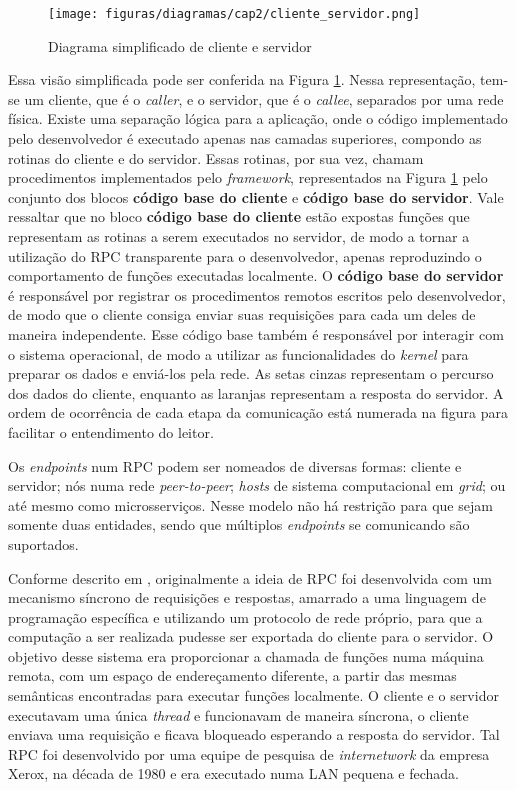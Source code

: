 \begin{figure}[ht]
    \centering
    \caption{Diagrama simplificado de cliente e servidor}
    \texttt{[image: figuras/diagramas/cap2/cliente\_servidor.png]} 
    \label{fig:rpc_client_servidor}
\end{figure}

Essa visão simplificada pode ser conferida na Figura \ref{fig:rpc_client_servidor}. Nessa representação, tem-se um cliente, que é o \textit{caller}, e o servidor, que é o \textit{callee}, separados por uma rede física. Existe uma separação lógica para a aplicação, onde o código implementado pelo desenvolvedor é executado apenas nas camadas superiores, compondo as rotinas do cliente e do servidor. Essas rotinas, por sua vez, chamam procedimentos implementados pelo \textit{framework}, representados na Figura \ref{fig:rpc_client_servidor} pelo conjunto dos blocos \textbf{código base do cliente} e \textbf{código base do servidor}. Vale ressaltar que no bloco \textbf{código base do cliente} estão expostas funções que representam as rotinas a serem executados no servidor, de modo a tornar a utilização do RPC transparente para o desenvolvedor, apenas reproduzindo o comportamento de funções executadas localmente. O \textbf{código base do servidor} é responsável por registrar os procedimentos remotos escritos pelo desenvolvedor, de modo que o cliente consiga enviar suas requisições para cada um deles de maneira independente. Esse código base também é responsável por interagir com o sistema operacional, de modo a utilizar as funcionalidades do \textit{kernel} para preparar os dados e enviá-los pela rede. As setas cinzas representam o percurso dos dados do cliente, enquanto as laranjas representam a resposta do servidor. A ordem de ocorrência de cada etapa da comunicação está numerada na figura para facilitar o entendimento do leitor.

Os \textit{endpoints} num RPC podem ser nomeados de diversas formas: cliente e servidor; nós numa rede \textit{peer-to-peer}; \textit{hosts} de sistema computacional em \textit{grid}; ou até mesmo como microsserviços. Nesse modelo não há restrição para que sejam somente duas entidades, sendo que múltiplos \textit{endpoints} se comunicando são suportados\cite{bergstrom2007anycast}.

Conforme descrito em \cite{birrell1984implementing}, originalmente a ideia de RPC foi desenvolvida com um mecanismo síncrono de requisições e respostas, amarrado a uma linguagem de programação específica e utilizando um protocolo de rede próprio, para que a computação a ser realizada pudesse ser exportada do cliente para o servidor. O objetivo desse sistema era proporcionar a chamada de funções numa máquina remota, com um espaço de endereçamento diferente, a partir das mesmas semânticas encontradas para executar funções localmente. O cliente e o servidor executavam uma única \textit{thread} e funcionavam de maneira síncrona, o cliente enviava uma requisição e ficava bloqueado esperando a resposta do servidor. Tal RPC foi desenvolvido por uma equipe de pesquisa de \textit{internetwork} da empresa Xerox, na década de 1980 e era executado numa LAN pequena e fechada.

